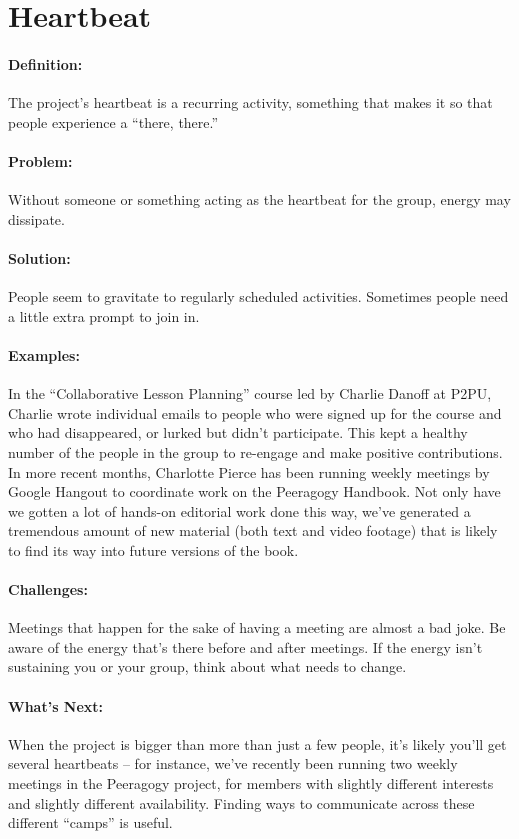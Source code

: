 \section{Heartbeat}

\paragraph{Definition:} The project's heartbeat is a recurring activity,
something that makes it so that people experience a ``there, there.''

\paragraph{Problem:} Without someone or something acting as the heartbeat
for the group, energy may dissipate.

\paragraph{Solution:} People seem to gravitate to regularly scheduled
activities. Sometimes people need a little extra prompt to join in.

\paragraph{Examples:} In the ``Collaborative Lesson Planning'' course led
by Charlie Danoff at P2PU, Charlie wrote individual emails to people who
were signed up for the course and who had disappeared, or lurked but
didn't participate. This kept a healthy number of the people in the
group to re-engage and make positive contributions. In more recent
months, Charlotte Pierce has been running weekly meetings by Google
Hangout to coordinate work on the Peeragogy Handbook. Not only have we
gotten a lot of hands-on editorial work done this way, we've generated a
tremendous amount of new material (both text and video footage) that is
likely to find its way into future versions of the book.

\paragraph{Challenges:} Meetings that happen for the sake of having a
meeting are almost a bad joke. Be aware of the energy that's there
before and after meetings. If the energy isn't sustaining you or your
group, think about what needs to change.

\paragraph{What's Next:} When the project is bigger than more than just a
few people, it's likely you'll get several heartbeats -- for instance,
we've recently been running two weekly meetings in the Peeragogy
project, for members with slightly different interests and slightly
different availability. Finding ways to communicate across these
different ``camps'' is useful.
